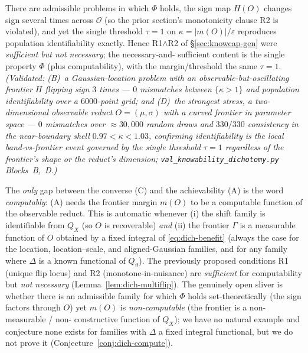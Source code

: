 \begin{lemma}[$\tau=1$ survives non-monotone, multi-flip frontiers; NUMERICAL]
\label{lem:dich-multiflip}
There are admissible problems in which $\Phi$ holds, the sign map $H(O)$ changes sign
several times across $\mathcal O$ (so the prior section's monotonicity clause R2 is
violated), and yet the single threshold $\tau=1$ on $\kappa=|m(O)|/\varepsilon$
reproduces population identifiability exactly. Hence R1$\wedge$R2 of
\S\ref{sec:knowcap-gen} were \emph{sufficient but not necessary}; the necessary-and-
sufficient content is the single property $\Phi$ (plus computability), with the
margin/threshold the same $\tau=1$.
\emph{(Validated: (B)~a Gaussian-location problem with an observable-but-oscillating
frontier $H$ flipping sign $3$ times --- $0$ mismatches between $\{\kappa>1\}$ and
population identifiability over a $6000$-point grid; and (D)~the strongest stress, a
\emph{two-dimensional} observable reduct $O=(\mu,\sigma)$ with a \emph{curved} frontier
in parameter space --- $0$ mismatches over $\approx\!30{,}000$ random draws and
$330/330$ consistency in the near-boundary shell $0.97<\kappa<1.03$, confirming
identifiability is the \emph{local} band-vs-frontier event governed by the single
threshold $\tau=1$ regardless of the frontier's shape or the reduct's dimension;
\texttt{val\_knowability\_dichotomy.py} Blocks~B,~D.)}
\end{lemma}

\begin{remark}\label{rmk:dich-compute}
The \emph{only} gap between the converse (C) and the achievability (A) is the word
\emph{computably}: (A) needs the frontier margin $m(O)$ to be a computable function of
the observable reduct. This is automatic whenever (i) the shift family is identifiable
from $Q_X$ (so $O$ is recoverable) \emph{and} (ii) the frontier $\Gamma$ is a
measurable function of $O$ obtained by a fixed integral of \eqref{eq:dich-benefit}
(always the case for the location, location--scale, and aligned-Gaussian families, and
for any family where $\Delta$ is a known functional of $Q_\vartheta$). The previously
proposed conditions R1 (unique flip locus) and R2 (monotone-in-nuisance) are
\emph{sufficient} for computability but \emph{not necessary}
(Lemma~\ref{lem:dich-multiflip}). The genuinely open sliver is whether there is an
admissible family for which $\Phi$ holds set-theoretically (the sign factors through
$O$) yet $m(O)$ is \emph{non-computable} (the frontier is a non-measurable / non-
constructive function of $Q_X$); we have no natural example and conjecture none exists
for families with $\Delta$ a fixed integral functional, but we do not prove it
(Conjecture~\ref{conj:dich-compute}).
\end{remark}

